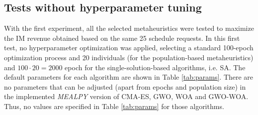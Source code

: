 \documentclass[Afour,sagev,times]{sagej}
\begin{document}
\subsection{Tests without hyperparameter tuning}
\label{sec:tests_without_hiperparameter_tunning}

With the first experiment, all the selected metaheuristics were tested to maximize the \gls{IM} revenue obtained based on the same 25 schedule requests. In this first test, no hyperparameter optimization was applied, selecting a standard 100-epoch optimization process and 20 individuals (for the population-based metaheuristics) and $ 100 \cdot 20 = 2000 $ epoch for the single-solution-based algorithms, i.e. \gls{SA}. The default parameters for each algorithm are shown in Table \ref{tab:params}. There are no parameters that can be adjusted (apart from epochs and population size) in the implemented \textit{MEALPY} version of \gls{CMA-ES}, \gls{GWO}, \gls{WOA} and \gls{GWO-WOA}. Thus, no values are specified in Table \ref{tab:params} for those algorithms.
\end{document}
